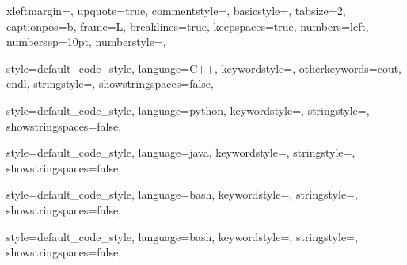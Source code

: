 \newcommand\blfootnote[1]{%
	\begingroup
	\renewcommand\thefootnote{}\footnote{#1}%
	\addtocounter{footnote}{-1}%
	\endgroup
}

\usepackage{fancyvrb}
\renewcommand{\theFancyVerbLine}{\rmfamily{\small\arabic{FancyVerbLine}.}}

\usepackage{verbatim}
\newlength\myverbindent
\setlength\myverbindent{1in} %
\makeatletter
\def\verbatim@processline{%
  \hspace{\myverbindent}\the\verbatim@line\par}
\makeatother

\usepackage{textcomp}
\usepackage{listings}
\usepackage{courier}

{
  xleftmargin=\parindent,
  upquote=true,
  commentstyle=\color{purple!40!black},
  basicstyle=\scriptsize\ttfamily,
  tabsize=2,
  captionpos=b,
  frame=L,
  breaklines=true,
  keepspaces=true,
  numbers=left,
  numbersep=10pt,
  numberstyle=\tiny\color{green},
}

{
  style=default_code_style,
  language=C++,
  keywordstyle=\color{blue},
  otherkeywords={cout, endl},
  stringstyle=\color{orange},
  showstringspaces=false,
}

{
  style=default_code_style,
  language=python,
  keywordstyle=\color{blue},
  stringstyle=\color{orange},
  showstringspaces=false,
}

{
  style=default_code_style,
  language=java,
  keywordstyle=\color{blue},
  stringstyle=\color{orange},
  showstringspaces=false,
}

{
  style=default_code_style,
  language=bash,
  keywordstyle=\color{blue},
  stringstyle=\color{orange},
  showstringspaces=false,
}

{
  style=default_code_style,
  language=bash,
  keywordstyle=\color{blue},
  stringstyle=\color{orange},
  showstringspaces=false,
}

\usepackage{fancyhdr}
\fancyhf{} %

\makeatletter
\renewcommand*{\ps@plain}{%
  \let\@mkboth\@gobbletwo
  \let\@oddhead\@empty
  \def\@oddfoot{%
    \reset@font
    \hfil
    \thepage
  }%
  \let\@evenhead\@empty
  \let\@evenfoot\@oddfoot
}
\makeatother

\makeatletter
{}
\makeatother

\pagestyle{plain}
